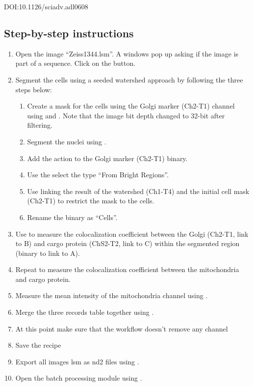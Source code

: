 DOI:10.1126/sciadv.adl0608

\subsection*{Step-by-step instructions}
\begin{enumerate}
    \item Open the image ``Zeiss1344.lsm''. A windows pop up asking if the image is part of a sequence. Click on the  button.
    \item Segment the cells using a seeded watershed approach by following the three steps below:
    \begin{enumerate}
        \item Create a mask for the cells using the Golgi marker (Ch2-T1) channel using  and  . Note that the image bit depth changed to 32-bit after filtering.
        \item Segment the nuclei using  .
        \item Add the action  to the Golgi marker (Ch2-T1) binary. 
        \item Use the  select the type ``From Bright Regions''. 
        \item Use  linking the result of the watershed (Ch1-T4) and the initial cell mask (Ch2-T1) to restrict the mask to the cells.
        \item Rename the binary as ``Cells''.
    \end{enumerate}
    \item Use  to measure the colocalization coefficient between the Golgi (Ch2-T1, link to B) and cargo protein (ChS2-T2, link to C) within the segmented region (binary to link to A). 
    \item Repeat to measure the colocalization coefficient between the mitochondria and cargo protein.
    \item Measure the mean intensity of the mitochondria channel using .
    \item Merge the three records table together using .
    \item At this point make sure that the workflow doesn't remove any channel
    \item Save the recipe
    \item Export all images lsm as nd2 files using .
    \item Open the batch processing module using .
\end{enumerate}
